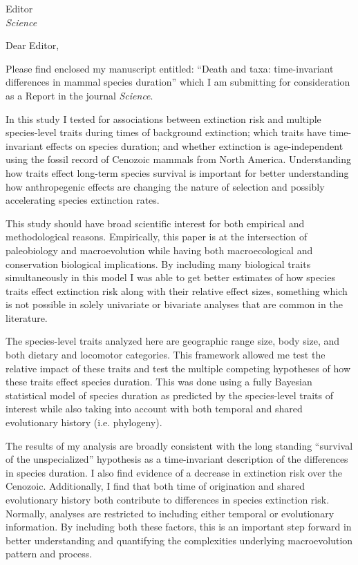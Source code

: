 \documentclass{letter}
\begin{document}
\begin{letter}{Editor \\ \textit{Science}}
  \opening{Dear Editor,}

  Please find enclosed my manuscript entitled: ``Death and taxa: time-invariant differences in mammal species duration'' which I am submitting for consideration as a Report in the journal \textit{Science}.

  In this study I tested for associations between extinction risk and multiple species-level traits during times of background extinction; which traits have time-invariant effects on species duration; and whether extinction is age-independent using the fossil record of Cenozoic mammals from North America. Understanding how traits effect long-term species survival is important for better understanding how anthropegenic effects are changing the nature of selection and possibly accelerating species extinction rates.

  This study should have broad scientific interest for both empirical and methodological reasons. Empirically, this paper is at the intersection of paleobiology and macroevolution while having both macroecological and conservation biological implications. By including many biological traits simultaneously in this model I was able to get better estimates of how species traits effect extinction risk along with their relative effect sizes, something which is not possible in solely univariate or bivariate analyses that are common in the literature. 
  
  The species-level traits analyzed here are geographic range size, body size, and both dietary and locomotor categories. This framework allowed me test the relative impact of these traits and test the multiple competing hypotheses of how these traits effect species duration. This was done using a fully Bayesian statistical model of species duration as predicted by the species-level traits of interest while also taking into account with both temporal and shared evolutionary history (i.e. phylogeny). 
  
  The results of my analysis are broadly consistent with the long standing ``survival of the unspecialized'' hypothesis as a time-invariant description of the differences in species duration. I also find evidence of a decrease in extinction risk over the Cenozoic. Additionally, I find that both time of origination and shared evolutionary history both contribute to differences in species extinction risk. Normally, analyses are restricted to including either temporal or evolutionary information. By including both these factors, this is an important step forward in better understanding and quantifying the complexities underlying macroevolution pattern and process.
  

\end{letter}
\end{document}
